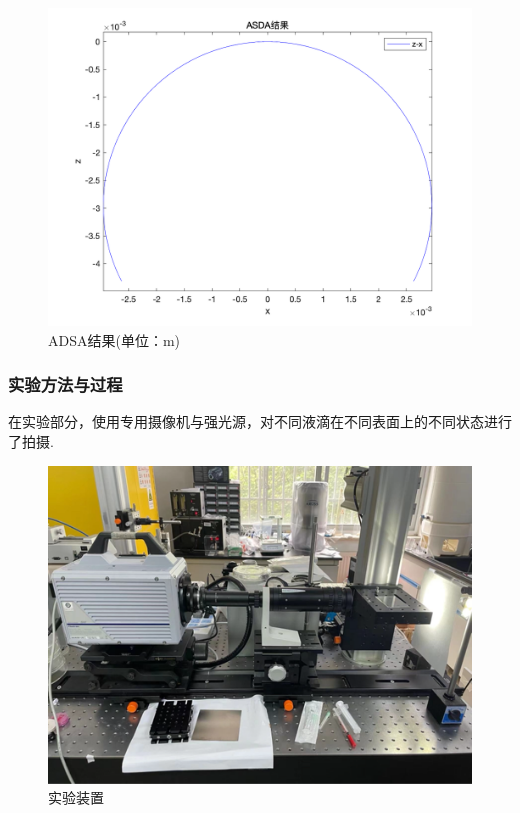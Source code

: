 \documentclass[a4paper,12pt]{article}%
\begin{document}
\begin{figure}[H]
    \centering
    \includegraphics[scale=0.15]{图像/V=8.92e-8.png}
    \caption{ADSA结果(单位：m)}\label{V}
\end{figure}

\subsubsection{实验方法与过程}
在实验部分，使用专用摄像机与强光源，对不同液滴在不同表面上的不同状态进行了拍摄. 
\begin{figure}[H]
    \centering
    \includegraphics[scale=0.4]{图像/实验装置.png}
    \caption{实验装置}
\end{figure}
\end{document}
